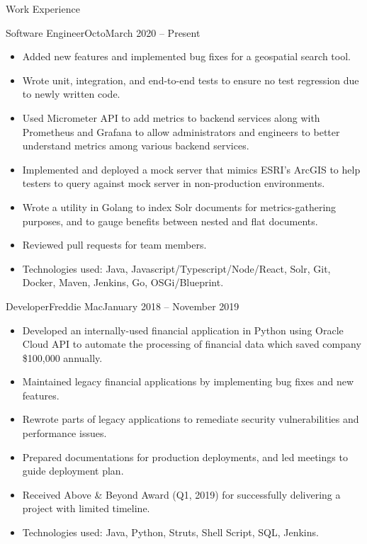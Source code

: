\documentclass[]{mcdowellcv}
\begin{document}
	\begin{cvsection}{Work Experience}
		\begin{cvsubsection}{Software Engineer}{Octo}{March 2020 -- Present}
			\begin{itemize}
        \item Added new features and implemented bug fixes for a geospatial
          search tool.
        \item Wrote unit, integration, and end-to-end tests to ensure no test regression due to newly written code.
				\item Used Micrometer API to add metrics to backend services along with
          Prometheus and Grafana to allow administrators and engineers to better
          understand metrics among various backend services.
				\item Implemented and deployed a mock server that mimics ESRI's ArcGIS to help
          testers to query against mock server in non-production environments.
				\item Wrote a utility in Golang to index Solr documents for metrics-gathering purposes, and to gauge benefits between nested and flat documents.
        \item Reviewed pull requests for team members.
        \item Technologies used: Java, Javascript/Typescript/Node/React, Solr,
          Git, Docker, Maven, Jenkins, Go, OSGi/Blueprint.
			\end{itemize}
		\end{cvsubsection}
		
		\begin{cvsubsection}{Developer}{Freddie Mac}{January 2018 -- November 2019}	
			\begin{itemize}
				\item Developed an internally-used financial application in Python using
          Oracle Cloud API to automate the processing of financial data which
          saved company \$100,000 annually.
				\item Maintained legacy financial applications by implementing bug fixes and new features.
        \item Rewrote parts of legacy applications to remediate security vulnerabilities and performance issues.
        \item Prepared documentations for production deployments, and led meetings to guide deployment plan.
        \item Received Above \& Beyond Award (Q1, 2019) for successfully delivering a project with limited timeline.
        \item Technologies used: Java, Python, Struts, Shell Script, SQL, Jenkins.
			\end{itemize}
		\end{cvsubsection}
	\end{cvsection}
	
\end{document}
